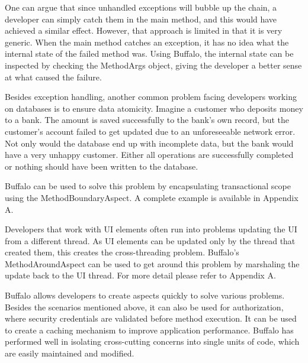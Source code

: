 One can argue that since unhandled exceptions will bubble up the chain, a developer can simply catch them in the main method, and this would have achieved a similar effect. However, that approach is limited in that it is very generic. When the main method catches an exception, it has no idea what the internal state of the failed method was. Using Buffalo, the internal state can be inspected by checking the MethodArgs object, giving the developer a better sense at what caused the failure.

Besides exception handling, another common problem facing developers working on databases is to ensure data atomicity. Imagine a customer who deposits money to a bank. The amount is saved successfully to the bank’s own record, but the customer’s account failed to get updated due to an unforeseeable network error. Not only would the database end up with incomplete data, but the bank would have a very unhappy customer. Either all operations are successfully completed or nothing should have been written to the database.

Buffalo can be used to solve this problem by encapsulating transactional scope using the MethodBoundaryAspect. A complete example is available in Appendix A.

Developers that work with UI elements often run into problems updating the UI from a different thread. As UI elements can be updated only by the thread that created them, this creates the cross-threading problem. Buffalo’s MethodAroundAspect can be used to get around this problem by marshaling the update back to the UI thread. For more detail please refer to Appendix A.

Buffalo allows developers to create aspects quickly to solve various problems. Besides the scenarios mentioned above, it can also be used for authorization, where security credentials are validated before method execution. It can be used to create a caching mechanism to improve application performance. Buffalo has performed well in isolating cross-cutting concerns into single units of code, which are easily maintained and modified.

